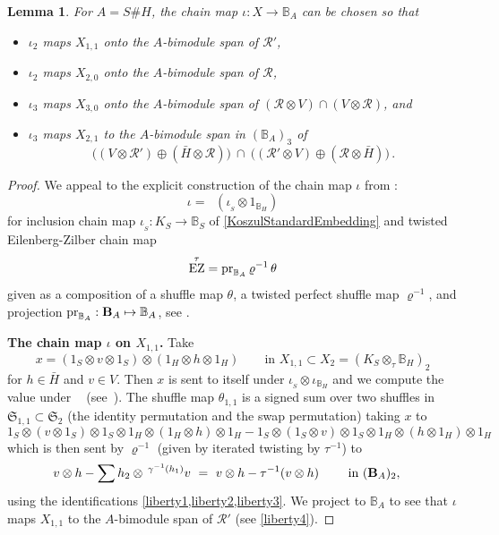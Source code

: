 \documentclass[11pt]{amsart}
\numberwithin{equation}{section}
\newtheorem{lemma}[equation]{Lemma}
\newcommand{\pr}{ {\rm{pr}} }%
\newcommand{\igamma}{\gamma^{-1}}
\newcommand{\R}{\mathcal{R}}
\newcommand{\B}{{\bf B}} %
\newcommand{\BB}{\mathbb{B}} %
\DeclareMathOperator{\EZ}{EZ}
\DeclareMathOperator{\EZt}{{\EZ^{\tau}}}
\renewcommand{\_}[1]{\mbox{$_{\left( #1 \right)}$}}
\newcommand{\ot}{\otimes}
\newcommand{\ott}{\otimes_{\tau}}
\newcommand{\Ho}{H}%
\begin{document}
{    %
  \begin{lemma}\label{ExplicitValues}
    For $A=S\# H$, 
    the chain map $\iota:X\rightarrow \BB_{A}$ can be chosen so that
    \begin{itemize}
    \item
     $\iota_2$ maps $X_{1,1}$
      onto the $A$-bimodule span of
      $\R'$,
\item 
     $\iota_2$ maps $X_{2,0}$
     onto the $A$-bimodule span of
     $\R$,
     \item
  $\iota_3$ maps $X_{3,0}$
   onto the $A$-bimodule span of
$  ( \R \ot V)
\cap ( V\ot \R )$, and
     \item
  $\iota_3$ maps $X_{2,1}$
to the $A$-bimodule span in $(\BB_A)_3$ of
  $$
 \big( (V\ot \R') 
\oplus 
(\bar H\ot \R)\big)
\ \cap\ 
\big((\R'\ot V) 
\oplus
(\R\ot \bar H)\big)\, .
$$
\end{itemize}
  \end{lemma}
  \begin{proof}
     We appeal to the explicit construction of the chain map $\iota$ from
    \cite[Theorem 11.8]{TTP-AWEZ}: 
    $$\iota=\EZt(\iota_{_S}\ot 1_{\BB_H})$$ for
    inclusion chain map $\iota_{_S}: K_S\rightarrow \BB_S$
    of \cref{KoszulStandardEmbedding} and 
    twisted
  Eilenberg-Zilber chain map
  \[
     \EZt=\pr_{\BB_A} \, \varrho^{-1}\, \theta
\]
  given as a composition of
  a shuffle map $\theta$, a twisted perfect shuffle map
  $\varrho^{-1}$,
  and projection 
  $\pr_{\BB_A}:\B_A\mapsto \BB_A$, see
  \cite[Section 4]{TTP-AWEZ}.

  {\bf The chain map $\iota$ on $X_{1,1}$.}
  Take
  $$x=(1_S\ot v\ot 1_S)\ot (1_H\ot h\ot 1_H)
  \qquad\text{in $X_{1,1}\subset X_2=(K_S\ott \BB_H)_2$}
  $$
  for $h\in \bar{\Ho}$ and $v \in V$. 
  Then $x$ is sent to itself under $\iota_{_S}\ot \iota_{\BB_H}$
  and we compute the value under 
$\EZt$ (see~\cite[(4.3), (4.7)]{TTP-AWEZ}).
  The shuffle map $\theta_{1,1}$
  is a signed sum over two shuffles in $\mathfrak{S}_{1,1}\subset \mathfrak{S}_2$
  (the identity permutation and the swap permutation)
  taking $x$ 
  to
  $$1_S\ot (v\ot 1_S)\ot 1_S \ot 1_H\ot (1_H\ot h)\ot 1_H
  -
  1_S\ot (1_S\ot v)\ot 1_S \ot 1_H\ot (h\ot 1_H)\ot 1_H
  $$
  which is then sent by $\varrho^{-1}$ (given by iterated twisting by $\tau^{-1}$)
to
\begin{equation}\label{IotaOnX11}
\begin{aligned}
 v\ot h
 & -\sum h_2 \ot \, ^{\igamma(h_1)}v
 \ =\  v\ot h - \tau^{-1}(v\ot h)
 \qquad\text{ in $(\B_A)_2$},
\end{aligned}
\end{equation}
using the identifications \cref{liberty1,liberty2,liberty3}.  We project to $\BB_A$ to see that
$\iota$ maps $X_{1,1}$ to the $A$-bimodule span of $\R'$ (see \cref{liberty4}).
 

\end{proof}}
\end{document}
